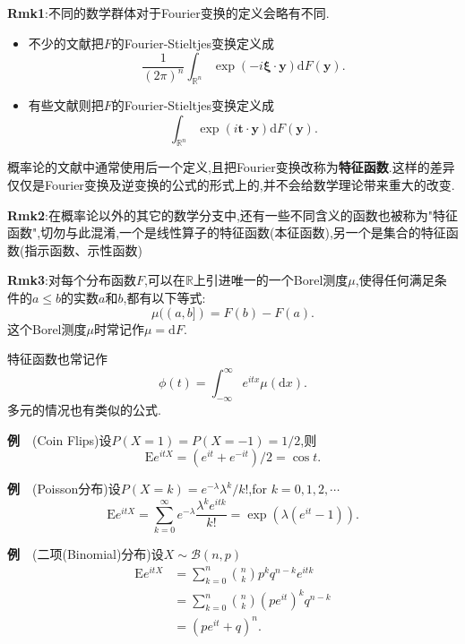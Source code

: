 \begin{frame}
	\textbf{Rmk1}:不同的数学群体对于\alert{Fourier变换}的定义会略有不同.
	\begin{itemize}
		\item 不少的文献把$F$的Fourier-Stieltjes变换定义成
			\begin{equation}
				\frac{1}{(2\pi)^n}\int_{\mathbb{R}^n}\exp(-i\bm{\xi}\cdot\bm{y})\mathrm{d}F(\bm{y}).
			\end{equation}
		\item 有些文献则把$F$的Fourier-Stieltjes变换定义成
			\begin{equation}
				\int_{\mathbb{R}^n}\exp(i\bm{t}\cdot\bm{y})\mathrm{d}F(\bm{y}).
			\end{equation}
	\end{itemize}
	概率论的文献中通常使用后一个定义,且把Fourier变换改称为\textbf{特征函数}.这样的差异仅仅是Fourier变换及逆变换的公式的形式上的,并不会给数学理论带来重大的改变.
	
	\textbf{Rmk2}:在概率论以外的其它的数学分支中,还有一些不同含义的函数也被称为"特征函数",切勿与此混淆,一个是线性算子的特征函数(本征函数),另一个是集合的特征函数(指示函数、示性函数)
\end{frame}

\begin{frame}
	\textbf{Rmk3}:对每个分布函数$F$,可以在$\mathbb{R}$上引进唯一的一个Borel测度$\mu$,使得任何满足条件的$a\leqslant b$的实数$a$和$b$,都有以下等式:
	\begin{equation}
		\mu((a,b]) = F(b) - F(a).
	\end{equation}
	这个Borel测度$\mu$时常记作$\mu = \mathrm{d}F$.
	
	特征函数也常记作\begin{equation}
		\phi(t) = \int_{-\infty}^\infty e^{itx}\mu(\mathrm{d}x).
	\end{equation}
	多元的情况也有类似的公式.
\end{frame}

\begin{frame}
	\textbf{例}$\quad$(Coin Flips)设$P(X=1) = P(X=-1) = 1/2$,则
	\begin{equation}
		\mathrm{E}e^{itX} = (e^{it}+e^{-it})/2 = \cos t.
	\end{equation}
	
	\textbf{例}$\quad$(Poisson分布)设$P(X=k) = e^{-\lambda}\lambda^k/k!$,for $k = 0,1,2,\cdots$
	\begin{equation}
		\mathrm{E}e^{itX} = \sum_{k=0}^\infty e^{-\lambda}\frac{\lambda^k e^{itk}}{k!} = \exp(\lambda (e^{it}-1)).
	\end{equation}
	
	\textbf{例}$\quad$(二项(Binomial)分布)设$X\sim \mathcal{B}(n,p)$
	\begin{equation}
	\begin{split}
		\mathrm{E}e^{itX} &= \sum_{k=0}^n\binom{n}{k}p^kq^{n-k}e^{itk} \\
		&=\sum_{k=0}^n\binom{n}{k}(pe^{it})^kq^{n-k} \\
		&=(pe^{it}+q)^n.
		\end{split}
	\end{equation}
	
\end{frame}

